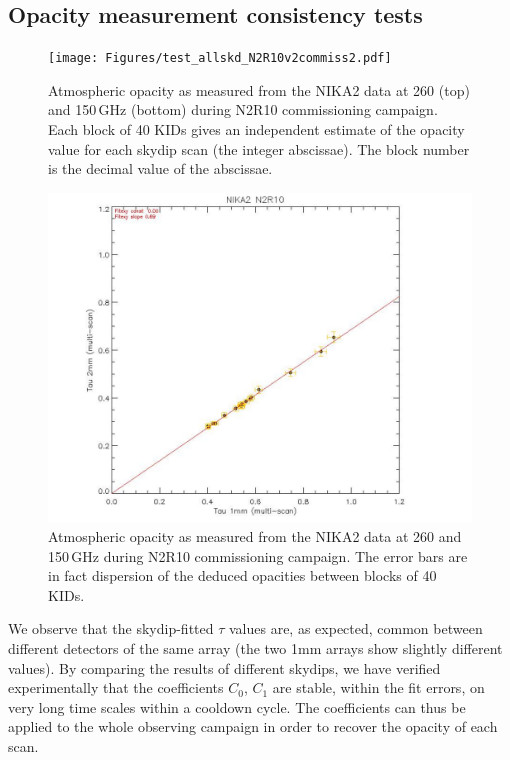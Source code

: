 \subsection{Opacity measurement consistency tests}


\begin{figure}[ht]
\begin{center}
\texttt{[image: Figures/test\_allskd\_N2R10v2commiss2.pdf]}
\caption{Atmospheric opacity as measured from the NIKA2 data 
at 260 (top) and 150\,GHz (bottom) during N2R10
commissioning campaign. Each block of 40 KIDs gives an independent estimate of
the opacity value for each skydip scan (the integer abscissae). The block
number is the decimal value of the abscissae.
\label{fig:taumeas_paper}}
\end{center}
\end{figure}

\begin{figure}[ht]
\begin{center}
\includegraphics[scale=0.8]{Figures/test_allskd_N2R10v2commiss1.pdf}
\caption{Atmospheric opacity as measured from the NIKA2 data 
at 260 and 150\,GHz during N2R10
commissioning campaign. The error bars are in fact dispersion of the deduced
opacities between blocks of 40 KIDs.
\label{fig:taumeas_paper}}
\end{center}
\end{figure}

We observe that the skydip-fitted $\tau$ values are, as expected, common
between different detectors of the same array (the two 1mm arrays show
slightly different values). By comparing the results of different skydips, we
have verified experimentally that the coefficients $C_0$, $C_1$ are stable,
within the fit errors, on very long time scales within a cooldown cycle. The
coefficients can thus be applied to the whole observing campaign in order to
recover the opacity of each scan.


